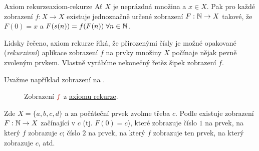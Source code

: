 \begin{proposition}{Axiom rekurze}{axiom-rekurze}
 Ať $X$ je neprázdná množina a $x \in X$. Pak pro každé zobrazení $f:X \to X$
 existuje jednoznačně určené zobrazení $F:\mathbb{N} \to X$ takové, že $F(0) = x$ a
 $F(s(n)) = f(F(n)) \; \forall n \in \mathbb{N}$.
\end{proposition}

Lidsky řečeno, axiom rekurze říká, že přirozenými čísly je možné 
opakované (\emph{rekurzivní}) aplikace zobrazení $f$ na prvky množiny $X$
počínaje nějak pevně zvoleným prvkem. Vlastně vyrábíme nekonečný řetěz šipek
zobrazení $f$.

Uvažme například zobrazení na .
\begin{figure}[ht]
 \centering

 \caption{Zobrazení $\clr{f}$ z \hyperref[prop:axiom-rekurze]{axiomu rekurze}.}
 \label{fig:zobrazeni-axiom-rekurze}
\end{figure}

Zde $X = \{a,b,c,d\}$ a za počáteční prvek zvolme třeba $c$. Podle
 existuje zobrazení $F:\mathbb{N} \to X$ začínající v
$c$ (tj. $F(0) = c$), které zobrazuje číslo $1$ na prvek, na který $f$ zobrazuje
$c$; číslo $2$ na prvek, na který $f$ zobrazuje ten prvek, na který zobrazuje
$c$, atd.


